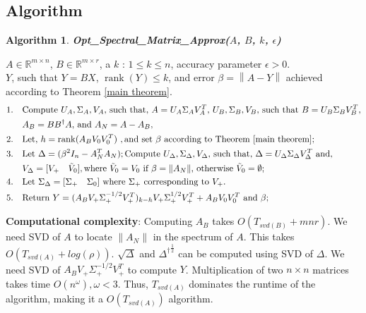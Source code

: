\documentclass[11pt]{article}
\newcommand{\rank}{\operatorname{rank}}
\newtheorem{alg}{Algorithm}
\def\reals{\mathbb{R}}
\newcommand{\norm}[1]{\left\|#1\right\|}
\begin{document}
\subsection{Algorithm}
\begin{framed}
\begin{alg}\label{alg:outline}
{\bf Opt\_Spectral\_Matrix\_Approx($A$, $B$, $k$, $\epsilon$) }
\end{alg}
 $A \in \reals^{m \times n}$, $B \in \reals^{m \times r}$, a $k$ : $1 \leq k \leq n$, accuracy parameter $\epsilon > 0$.\\
 $Y$, such that $Y=BX$, $\rank(Y) \leq k$, and error $\beta = \norm{A - Y}$ achieved according to Theorem \ref{main theorem}.
%
\begin{align*}
1. \quad& \text{Compute $U_A, \Sigma_A, V_A$, such that, $ A = U_A\Sigma_A V_A^T$, $U_B, \Sigma_B, V_B$, such that $ B = U_B\Sigma_B V_B^T$,}\\ 
& \text{$A_B = BB^{\dagger}A$, and $A_N = A - A_B$}, \\
2. \quad& \text{Let, $h=\rank(A_BV_0V_0^T)$ }, \text{and set $\beta$ according to Theorem \ref{main theorem}};\\
3. \quad& \text{Let }\Delta = (\beta^2 I_n - A_N^TA_N); \text{Compute $U_{\Delta}, \Sigma_{\Delta}, V_{\Delta}$, such that, $ \Delta = U_{\Delta}\Sigma_{\Delta} V_{\Delta}^T$ and}, \\
& V_{\Delta}=[V_+ \quad \tilde{V}_0], \text{where $\tilde{V}_0 = V_0$ if $\beta = \norm{A_N}$, otherwise $\tilde{V}_0 = \emptyset$}; \\
4. \quad & \text{Let $\Sigma_{\Delta} = [\Sigma_+ \quad \Sigma_0]$ where $\Sigma_+$ corresponding to $V_+$}.\\
5. \quad& \text{Return } Y = (A_BV_+{\Sigma}^{-1/2}_+V_+^T)_{k-h}V_+{\Sigma}^{1/2}_+V_+^T + A_BV_0V_0^T \text{ and } \beta;
\end{align*}
%
\end{framed}

\noindent \textbf{Computational complexity}: \quad Computing $A_B$ takes $O(T_{svd(B)}+mnr)$. We need SVD of $A$ to locate $\norm{A_N}$ in the spectrum of $A$. This takes $O(T_{svd(A)}+ log (\rho))$. $\sqrt{\Delta}$ and ${{\Delta}^{\dagger}}^{\frac{1}{2}}$ can be computed using SVD of $\Delta$. We need SVD of $A_BV_+{\Sigma}^{-1/2}_+V_+^T$ to compute $Y$. Multiplication of two $n \times n$ matrices takes time $O(n^\omega), \omega < 3$. Thus, $T_{svd(A)}$ dominates the runtime of the algorithm, making it a $O(T_{svd(A)})$ algorithm. \\
\end{document}
